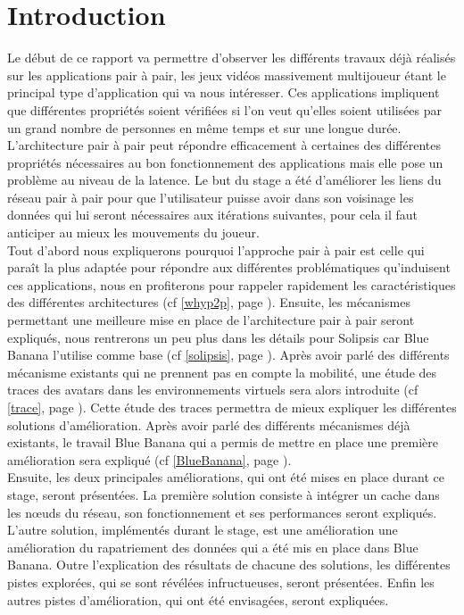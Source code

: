 \section{Introduction}
	Le début de ce rapport va permettre d'observer les différents travaux déjà réalisés sur les applications pair à pair, les jeux vidéos massivement multijoueur étant le principal type d'application qui va nous intéresser. Ces applications impliquent que différentes propriétés soient vérifiées si l'on veut qu'elles soient utilisées par un grand nombre de personnes en même temps et sur une longue durée. L'architecture pair à pair peut répondre efficacement à certaines des différentes propriétés nécessaires au bon fonctionnement des applications mais elle pose un problème au niveau de la latence. Le but du stage a été d'améliorer les liens du réseau pair à pair pour que l'utilisateur puisse avoir dans son voisinage les données qui lui seront nécessaires aux itérations suivantes, pour cela il faut anticiper au mieux les mouvements du joueur.\\

	Tout d'abord nous expliquerons pourquoi l'approche pair à pair est celle qui paraît la plus adaptée pour répondre aux différentes problématiques qu'induisent ces applications, nous en profiterons pour rappeler rapidement les caractéristiques des différentes architectures (cf \ref{whyp2p}, page \pageref{whyp2p}). Ensuite, les mécanismes permettant une meilleure mise en place de l'architecture pair à pair seront expliqués, nous rentrerons un peu plus dans les détails pour Solipsis car Blue Banana l'utilise comme base (cf \ref{solipsis}, page \pageref{solipsis}).  Après avoir parlé des différents mécanisme existants qui ne prennent pas en compte la mobilité, une étude des traces des avatars dans les environnements virtuels sera alors introduite (cf \ref{trace}, page \pageref{trace}). Cette étude des traces permettra de mieux expliquer les différentes solutions d'amélioration. Après avoir parlé des différents mécanismes déjà existants, le travail Blue Banana qui a permis de mettre en place une première amélioration sera expliqué (cf \ref{BlueBanana}, page \pageref{BlueBanana}). \\
	
	Ensuite, les deux principales améliorations, qui ont été mises en place durant ce stage, seront présentées. La première solution consiste à intégrer un cache dans les nœuds du réseau, son fonctionnement et ses performances seront expliqués. L'autre solution, implémentés durant le stage, est une amélioration une amélioration du rapatriement des données qui a été mis en place dans Blue Banana. Outre l'explication des résultats de chacune des solutions, les différentes pistes explorées, qui se sont révélées infructueuses, seront présentées. Enfin les autres pistes d'amélioration, qui ont été envisagées, seront expliquées.

